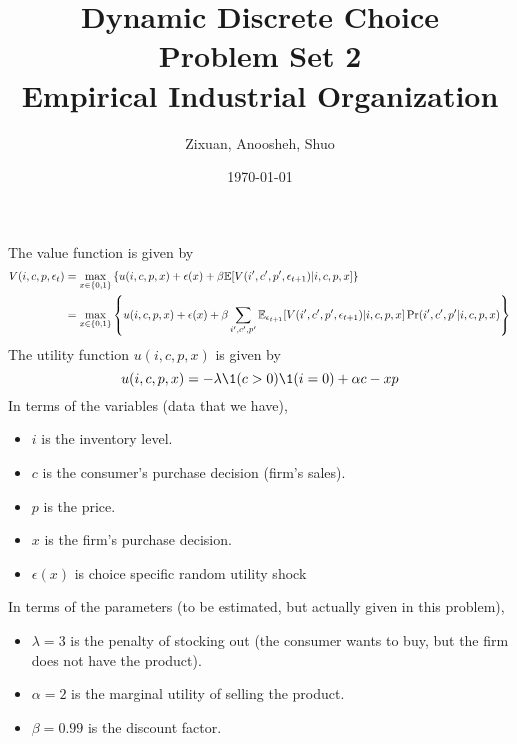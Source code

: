 \documentclass[12pt]{article}[margin=1in]
\title{\textbf{Dynamic Discrete Choice} \\
\vspace{.3cm}
\large Problem Set 2 \\
Empirical Industrial Organization}
\author{Zixuan, Anoosheh, Shuo}
\date{\today}
\begin{document}
\maketitle

\setcounter{page}{1}

The value function is given by
\begin{equation*}
    \begin{split}
        V(i,c,p,\epsilon_t) & = \max_{x \in \{0,1\}} \left\{ u(i,c,p,x) + \epsilon(x)+ \beta \mathbb{E}[V(i',c',p',\epsilon_{t+1})|i,c,p,x] \right\}                                                        \\
                            & = \max_{x \in \{0,1\}} \left\{ u(i,c,p,x) + \epsilon(x)+ \beta \sum_{i',c',p'}\mathbb{E}_{\epsilon_{t+1}}[V(i',c',p',\epsilon_{t+1})|i,c,p,x] \Pr(i', c',p'|i,c,p,x) \right\} \\
    \end{split}
\end{equation*}
The utility function $u(i,c,p,x)$ is given by
\begin{equation*}
    u(i,c,p,x) = -\lambda \1(c>0)\1(i=0) + \alpha c -xp
\end{equation*}
In terms of the variables (data that we have),
\begin{itemize}
    \item $i$ is the inventory level.
    \item $c$ is the consumer's purchase decision (firm's sales).
    \item $p$ is the price.
    \item $x$ is the firm's purchase decision.
    \item $\epsilon(x)$ is choice specific random utility shock
\end{itemize}
In terms of the parameters (to be estimated, but actually given in this problem),
\begin{itemize}
    \item $\lambda=3$ is the penalty of stocking out (the consumer wants to buy, but the firm does not have the product).
    \item $\alpha=2$ is the marginal utility of selling the product.
    \item $\beta=0.99$ is the discount factor.
\end{itemize}
\end{document}
